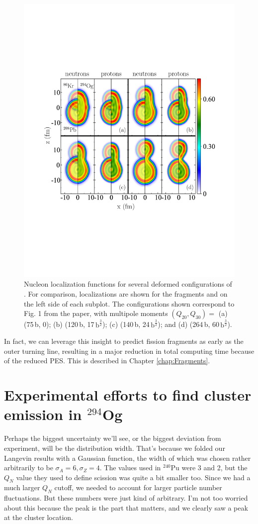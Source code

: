 \begin{figure}
	\centering
	\includegraphics[width=0.9\linewidth]{TeX_files/294Og_locali}
	\caption[Nucleon localization visualization of $^{294}$Og prefragment formation.]{Nucleon localization functions for several deformed configurations of {\Og}. For comparison, localizations are shown for the fragments {\Pb} and {\Kr} on the left side of each subplot. The configurations shown correspond to Fig. 1 from the paper, with multipole moments $(Q_{20}, Q_{30})=$ (a) (75\,b, 0); (b) (120\,b, 17\,$\mathrm{b}^\frac{3}{2}$); (c) (140\,b, 24\,$\mathrm{b}^\frac{3}{2}$); and (d) (264\,b, 60\,$\mathrm{b}^\frac{3}{2}$).}
	\label{fig:294oglocali}
\end{figure}

In fact, we can leverage this insight to predict fission fragments as early as the outer turning line, resulting in a major reduction in total computing time because of the reduced PES. This is described in Chapter \ref{chap:Fragments}.


\section{Experimental efforts to find cluster emission in $^{294}$Og}
Perhaps the biggest uncertainty we'll see, or the biggest deviation from experiment, will be the distribution width. That's because we folded our Langevin results with a Gaussian function, the width of which was chosen rather arbitrarily to be $\sigma_A=6, \sigma_Z=4$. The values used in $^{240}$Pu were 3 and 2, but the $Q_N$ value they used to define scission was quite a bit smaller too. Since we had a much larger $Q_N$ cutoff, we needed to account for larger particle number fluctuations. But these numbers were just kind of arbitrary. I'm not too worried about this because the peak is the part that matters, and we clearly saw a peak at the cluster location.


